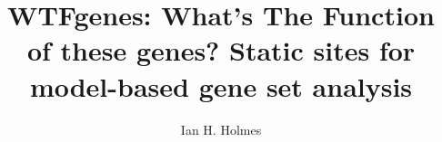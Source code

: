 \documentclass{article}
\begin{document}
\newcommand\structabs[5]{\maketitle \abstract{#1 #2 #3 Contact: #4}}

\title{WTFgenes: What's The Function of these genes? Static sites for model-based gene set analysis}
\author{Ian H. Holmes}


\end{document}
